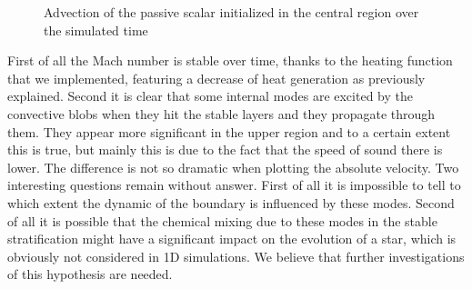 \begin{figure}[t!]
\centering
{}
\hfill
{}
\caption{Advection of the passive scalar initialized in the central region over the simulated time}
\label{fig:2dpassive}
\end{figure}

First of all the Mach number is stable over time, thanks to the heating function that we implemented, featuring a decrease of heat generation as previously explained. 
Second it is clear that some internal modes are excited by the convective blobs when they hit the stable layers and they propagate through them. They appear more significant in the upper region and to a certain extent this is true, but mainly this is due to the fact that the speed of sound there is lower. The difference is not so dramatic when plotting the absolute velocity. Two interesting questions remain without answer. First of all it is impossible to tell to which extent the dynamic of the boundary is influenced by these modes. Second of all it is possible that the chemical mixing due to these modes in the stable stratification might have a significant impact on the evolution of a star, which is obviously not considered in 1D simulations. We believe that further investigations of this hypothesis are needed.

